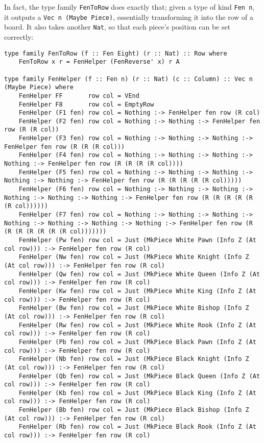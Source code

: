 \documentclass[12pt, a4paper, bibliography=totocnumbered]{scrreprt}
\newcommand{\inline}[1]{\lstinline[basicstyle=\ttfamily\footnotesize]{#1}}
\begin{document}
In fact, the type family \inline{FenToRow} does exactly that; given a type of kind \inline{Fen n}, it outputs a \inline{Vec n (Maybe Piece)}, essentially transforming it into the row of a board. It also takes another \inline{Nat}, so that each piece's position can be set correctly:

\begin{lstlisting}
type family FenToRow (f :: Fen Eight) (r :: Nat) :: Row where
    FenToRow x r = FenHelper (FenReverse' x) r A

type family FenHelper (f :: Fen n) (r :: Nat) (c :: Column) :: Vec n (Maybe Piece) where
    FenHelper FF       row col = VEnd
    FenHelper F8       row col = EmptyRow
    FenHelper (F1 fen) row col = Nothing :-> FenHelper fen row (R col)
    FenHelper (F2 fen) row col = Nothing :-> Nothing :-> FenHelper fen row (R (R col))
    FenHelper (F3 fen) row col = Nothing :-> Nothing :-> Nothing :-> FenHelper fen row (R (R (R col)))
    FenHelper (F4 fen) row col = Nothing :-> Nothing :-> Nothing :-> Nothing :-> FenHelper fen row (R (R (R (R col))))
    FenHelper (F5 fen) row col = Nothing :-> Nothing :-> Nothing :-> Nothing :-> Nothing :-> FenHelper fen row (R (R (R (R (R col)))))
    FenHelper (F6 fen) row col = Nothing :-> Nothing :-> Nothing :-> Nothing :-> Nothing :-> Nothing :-> FenHelper fen row (R (R (R (R (R (R col))))))
    FenHelper (F7 fen) row col = Nothing :-> Nothing :-> Nothing :-> Nothing :-> Nothing :-> Nothing :-> Nothing :-> FenHelper fen row (R (R (R (R (R (R (R col)))))))
    FenHelper (Pw fen) row col = Just (MkPiece White Pawn (Info Z (At col row))) :-> FenHelper fen row (R col)
    FenHelper (Nw fen) row col = Just (MkPiece White Knight (Info Z (At col row))) :-> FenHelper fen row (R col)
    FenHelper (Qw fen) row col = Just (MkPiece White Queen (Info Z (At col row))) :-> FenHelper fen row (R col)
    FenHelper (Kw fen) row col = Just (MkPiece White King (Info Z (At col row))) :-> FenHelper fen row (R col)
    FenHelper (Bw fen) row col = Just (MkPiece White Bishop (Info Z (At col row))) :-> FenHelper fen row (R col)
    FenHelper (Rw fen) row col = Just (MkPiece White Rook (Info Z (At col row))) :-> FenHelper fen row (R col)
    FenHelper (Pb fen) row col = Just (MkPiece Black Pawn (Info Z (At col row))) :-> FenHelper fen row (R col)
    FenHelper (Nb fen) row col = Just (MkPiece Black Knight (Info Z (At col row))) :-> FenHelper fen row (R col)
    FenHelper (Qb fen) row col = Just (MkPiece Black Queen (Info Z (At col row))) :-> FenHelper fen row (R col)
    FenHelper (Kb fen) row col = Just (MkPiece Black King (Info Z (At col row))) :-> FenHelper fen row (R col)
    FenHelper (Bb fen) row col = Just (MkPiece Black Bishop (Info Z (At col row))) :-> FenHelper fen row (R col)
    FenHelper (Rb fen) row col = Just (MkPiece Black Rook (Info Z (At col row))) :-> FenHelper fen row (R col)
\end{lstlisting}
\end{document}
